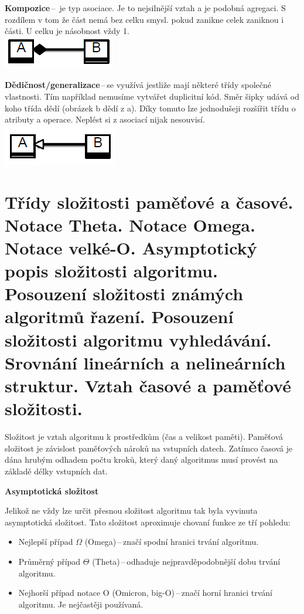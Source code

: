 \textbf{Kompozice}\,--\, je typ asociace. Je to nejsilnější vztah a je podobná agregaci. S rozdílem v tom že část nemá bez celku smysl. pokud zanikne celek zaniknou i části. U celku je násobnost vždy 1.\\ \includegraphics[scale=1]{BPC-TIN/images/kompozice.PNG}

\textbf{Dědičnost/generalizace}\,--\,se využívá jestliže mají některé třídy společné vlastnosti. Tím například nemusíme vytvářet duplicitní kód. Směr šipky udává od koho třída dědí (obrázek b dědí z a). Díky tomuto lze jednodušeji rozšířit třídu o atributy a operace. Neplést si z asociací nijak nesouvisí.\\
\includegraphics[scale=1]{BPC-TIN/images/dedicnost.PNG}






\newpage
\section{Třídy složitosti paměťové a časové. Notace Theta. Notace Omega. Notace velké-O. Asymptotický popis složitosti algoritmu. Posouzení složitosti známých algoritmů řazení. Posouzení složitosti algoritmu vyhledávání. Srovnání lineárních a nelineárních struktur. Vztah časové a paměťové složitosti.}

Složitost je vztah algoritmu k prostředkům (čas a velikost paměti). Paměťová složitost je závislost paměťových nároků na vstupních datech. Zatímco časová je dána hrubým odhadem počtu kroků, který daný algoritmus musí provést na základě délky vstupních dat.

\begin{Large}\vspace{0,5cm} \textbf{Asymptotická složitost}
\end{Large}

Jelikož ne vždy lze určit přesnou složitost algoritmu tak byla vyvinuta asymptotická složitost. Tato složitost aproximuje chovaní funkce ze tří pohledu:
\begin{itemize}
    \item Nejlepší případ $\Omega$ (Omega)\,--\,značí spodní hranici trvání algoritmu.
    \item Průměrný případ $\Theta$ (Theta)\,--\,odhaduje nejpravděpodobnější dobu trvání algoritmu.
    \item Nejhorší případ notace O (Omicron, big-O)\,--\,značí horní hranici trvání algoritmu. Je nejčastěji používaná.
\end{itemize}

